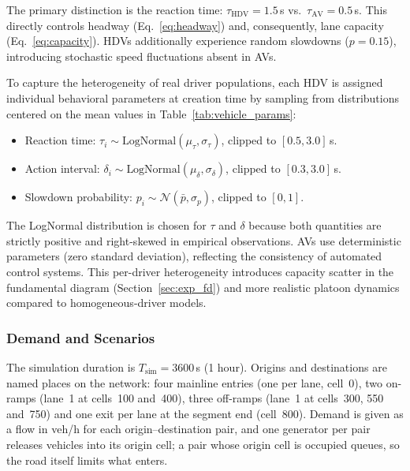 \documentclass[review,authoryear]{elsarticle}
\begin{document}
The primary distinction is the reaction time: $\tau_{\text{HDV}} = 1.5$\,s vs.\ $\tau_{\text{AV}} = 0.5$\,s. This directly controls headway (Eq.~\ref{eq:headway}) and, consequently, lane capacity (Eq.~\ref{eq:capacity}). HDVs additionally experience random slowdowns ($p = 0.15$), introducing stochastic speed fluctuations absent in AVs.

To capture the heterogeneity of real driver populations, each HDV is assigned individual behavioral parameters at creation time by sampling from distributions centered on the mean values in Table~\ref{tab:vehicle_params}:
\begin{itemize}
    \item Reaction time: $\tau_i \sim \text{LogNormal}(\mu_\tau, \sigma_\tau)$, clipped to $[0.5, 3.0]$\,s.
    \item Action interval: $\delta_i \sim \text{LogNormal}(\mu_\delta, \sigma_\delta)$, clipped to $[0.3, 3.0]$\,s.
    \item Slowdown probability: $p_i \sim \mathcal{N}(\bar{p}, \sigma_p)$, clipped to $[0, 1]$.
\end{itemize}
The LogNormal distribution is chosen for $\tau$ and $\delta$ because both quantities are strictly positive and right-skewed in empirical observations. AVs use deterministic parameters (zero standard deviation), reflecting the consistency of automated control systems. This per-driver heterogeneity introduces capacity scatter in the fundamental diagram (Section~\ref{sec:exp_fd}) and more realistic platoon dynamics compared to homogeneous-driver models.

\subsubsection{Demand and Scenarios}
\label{sec:demand}

The simulation duration is $T_{\text{sim}} = 3600$\,s (1 hour). Origins and destinations are named places on the network: four mainline entries (one per lane, cell~0), two on-ramps (lane~1 at cells~100 and~400), three off-ramps (lane~1 at cells~300, 550 and~750) and one exit per lane at the segment end (cell~800). Demand is given as a flow in veh/h for each origin--destination pair, and one generator per pair releases vehicles into its origin cell; a pair whose origin cell is occupied queues, so the road itself limits what enters.
\end{document}
